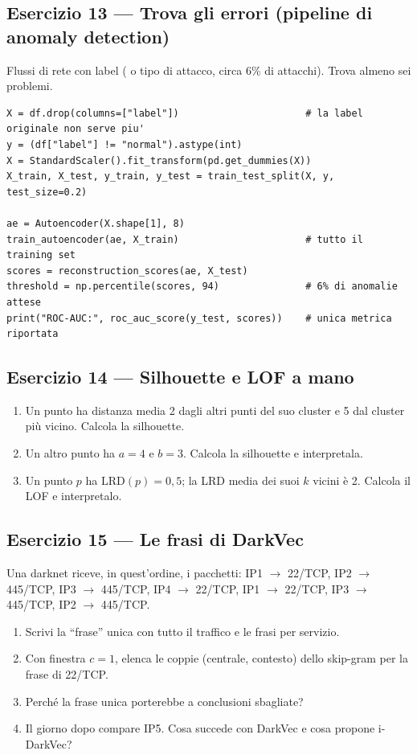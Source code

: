 \subsection*{Esercizio 13 --- Trova gli errori (pipeline di anomaly detection)}\label{es:e13}
Flussi di rete con label ( o tipo di attacco, circa 6\% di attacchi). Trova almeno sei problemi.
\begin{lstlisting}
X = df.drop(columns=["label"])                      # la label originale non serve piu'
y = (df["label"] != "normal").astype(int)
X = StandardScaler().fit_transform(pd.get_dummies(X))
X_train, X_test, y_train, y_test = train_test_split(X, y, test_size=0.2)

ae = Autoencoder(X.shape[1], 8)
train_autoencoder(ae, X_train)                      # tutto il training set
scores = reconstruction_scores(ae, X_test)
threshold = np.percentile(scores, 94)               # 6% di anomalie attese
print("ROC-AUC:", roc_auc_score(y_test, scores))    # unica metrica riportata
\end{lstlisting}

\subsection*{Esercizio 14 --- Silhouette e LOF a mano}\label{es:e14}
\begin{enumerate}[label=(\alph*)]
  \item Un punto ha distanza media 2 dagli altri punti del suo cluster e 5 dal cluster più vicino. Calcola la silhouette.
  \item Un altro punto ha $a = 4$ e $b = 3$. Calcola la silhouette e interpretala.
  \item Un punto $p$ ha $\mathrm{LRD}(p) = 0{,}5$; la LRD media dei suoi $k$ vicini è 2. Calcola il LOF e interpretalo.
\end{enumerate}

\subsection*{Esercizio 15 --- Le frasi di DarkVec}\label{es:e15}
Una darknet riceve, in quest'ordine, i pacchetti: IP1 $\to$ 22/TCP, IP2 $\to$ 445/TCP, IP3 $\to$ 445/TCP, IP4 $\to$ 22/TCP,
IP1 $\to$ 22/TCP, IP3 $\to$ 445/TCP, IP2 $\to$ 445/TCP.
\begin{enumerate}[label=(\alph*)]
  \item Scrivi la ``frase'' unica con tutto il traffico e le frasi per servizio.
  \item Con finestra $c = 1$, elenca le coppie (centrale, contesto) dello skip-gram per la frase di 22/TCP.
  \item Perché la frase unica porterebbe a conclusioni sbagliate?
  \item Il giorno dopo compare IP5. Cosa succede con DarkVec e cosa propone i-DarkVec?
\end{enumerate}

